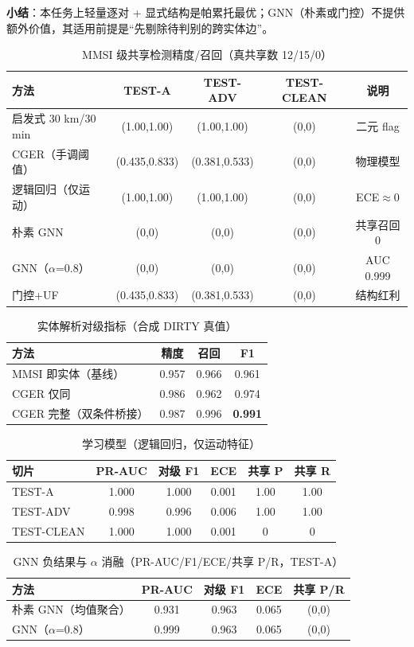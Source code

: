 \documentclass[10.5pt,a4paper]{ctexart}
\newcommand{\mmsi}{\text{MMSI}}
\begin{document}
\textbf{小结}：本任务上轻量逐对 + 显式结构是帕累托最优；GNN（朴素或门控）不提供额外价值，其适用前提是``先剔除待判别的跨实体边''。

\begin{table}[htbp]\centering\small
\caption{MMSI 级共享检测精度/召回（真共享数 12/15/0）}\label{t7}
\begin{tabular}{lcccc}
\toprule
方法 & TEST-A & TEST-ADV & TEST-CLEAN & 说明\\
\midrule
启发式 30 km/30 min & (1.00,1.00) & (1.00,1.00) & (0,0) & 二元 flag\\
CGER（手调阈值） & (0.435,0.833) & (0.381,0.533) & (0,0) & 物理模型\\
逻辑回归（仅运动） & (1.00,1.00) & (1.00,1.00) & (0,0) & ECE$\approx$0\\
朴素 GNN & (0,0) & (0,0) & (0,0) & 共享召回 0\\
GNN（$\alpha$=0.8） & (0,0) & (0,0) & (0,0) & AUC 0.999\\
门控+UF & (0.435,0.833) & (0.381,0.533) & (0,0) & 结构红利\\
\bottomrule
\end{tabular}
\end{table}
\begin{table}[htbp]\centering\small
\caption{实体解析对级指标（合成 DIRTY 真值）}\label{t8}
\begin{tabular}{lccc}
\toprule
方法 & 精度 & 召回 & F1\\
\midrule
MMSI 即实体（基线） & 0.957 & 0.966 & 0.961\\
CGER 仅同 \mmsi{} & 0.986 & 0.962 & 0.974\\
CGER 完整（双条件桥接） & 0.987 & 0.996 & \textbf{0.991}\\
\bottomrule
\end{tabular}
\end{table}
\begin{table}[htbp]\centering\small
\caption{学习模型（逻辑回归，仅运动特征）}\label{t9}
\begin{tabular}{lccccc}
\toprule
切片 & PR-AUC & 对级 F1 & ECE & 共享 P & 共享 R\\
\midrule
TEST-A & 1.000 & 1.000 & 0.001 & 1.00 & 1.00\\
TEST-ADV & 0.998 & 0.996 & 0.006 & 1.00 & 1.00\\
TEST-CLEAN & 1.000 & 1.000 & 0.001 & 0 & 0\\
\bottomrule
\end{tabular}
\end{table}
\begin{table}[htbp]\centering\small
\caption{GNN 负结果与 $\alpha$ 消融（PR-AUC/F1/ECE/共享 P/R，TEST-A）}\label{t10}
\begin{tabular}{lcccc}
\toprule
方法 & PR-AUC & 对级 F1 & ECE & 共享 P/R\\
\midrule
朴素 GNN（均值聚合） & 0.931 & 0.963 & 0.065 & (0,0)\\
GNN（$\alpha$=0.8） & 0.999 & 0.963 & 0.065 & (0,0)\\
\bottomrule
\end{tabular}
\end{table}
\end{document}
